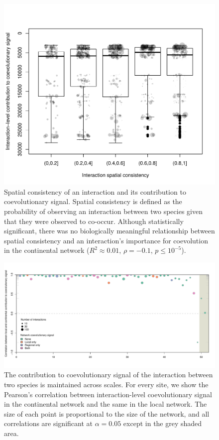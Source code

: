\documentclass[12pt]{article}
\begin{document}
\cleardoublepage
\begin{figure}[p!]
  \centering
  \includegraphics[width=\textwidth]{../figures/figure3.pdf}
	\caption{Spatial consistency of an interaction and its contribution to
coevolutionary signal. Spatial consistency is defined as the probability
of observing an interaction between two species given that they were
observed to co-occur. Although statistically significant, there was no
biologically meaningful relationship between spatial consistency and an
interaction's importance for coevolution in the continental network
(\(R^2 \approx 0.01\), \(\rho = -0.1\), \(p \leq 10^{-5}\)).}
	\label{consistency}
\end{figure}
\cleardoublepage
\begin{figure}[p!]
  \centering
  \includegraphics[width=\textwidth]{../figures/figure2.pdf}
	\caption{The contribution to coevolutionary signal of the interaction between two
species is maintained across scales. For every site, we show the
Pearson's correlation between interaction-level coevolutionary signal in
the continental network and the same in the local network. The size of
each point is proportional to the size of the network, and all
correlations are significant at \(\alpha = 0.05\) except in the grey
shaded area.}
	\label{scales}
\end{figure}
\cleardoublepage
\end{document}
